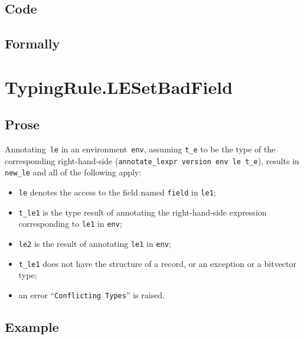 \documentclass{book}
\begin{document}
  \subsection{Code}

\begin{emptyformal}
    \subsection{Formally}
\end{emptyformal}


\section{TypingRule.LESetBadField \label{sec:TypingRule.LESetBadField}}

    \subsection{Prose}
   Annotating~\texttt{le} in an environment~\texttt{env}, assuming
\texttt{t\_e} to be the type of the corresponding right-hand-side
(\texttt{annotate\_lexpr version env le t\_e}), results in \texttt{new\_le} and
all of the following apply:
   \begin{itemize}
   \item \texttt{le} denotes the access to the field named \texttt{field} in \texttt{le1};
   \item \texttt{t\_le1} is the type result of annotating the right-hand-side expression corresponding to \texttt{le1} in \texttt{env};
   \item \texttt{le2} is the result of annotating \texttt{le1} in \texttt{env};
   \item \texttt{t\_le1} does not have the structure of a record, or an exception or a bitvector type;
   \item an error ``\texttt{Conflicting Types}'' is raised.
   \end{itemize}

  \subsection{Example}
\end{document}
